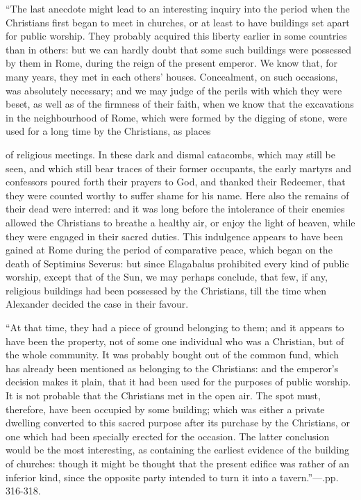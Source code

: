 ``The last
anecdote might lead to an interesting inquiry into the period when the
Christians first began to meet in churches, or at least to have
buildings set apart for public worship. They probably acquired this
liberty earlier in some countries than in others: but we can hardly
doubt that some such buildings were possessed by them in Rome, during
the reign of the present emperor. We know that, for many years, they met
in each others' houses. Concealment, on such occasions, was absolutely
necessary; and we may judge of the perils with which they were beset, as
well as of the firmness of their faith, when we know that the
excavations in the neighbourhood of Rome, which were formed by the
digging of stone, were used for a long time by the Christians, as places

of religious meetings. In these dark and dismal catacombs, which
may still be seen, and which still bear traces of their former
occupants, the early martyrs and confessors poured forth their prayers
to God, and thanked their Redeemer, that they were counted worthy to
suffer shame for his name. Here also the remains of their dead were
interred: and it was long before the intolerance of their enemies
allowed the Christians to breathe a healthy air, or enjoy the light of
heaven, while they were engaged in their sacred duties. This indulgence
appears to have been gained at Rome during the period of comparative
peace, which began on the death of Septimius Severus: but since
Elagabalus prohibited every kind of public worship, except that of the
Sun, we may perhaps conclude, that few, if any, religious buildings had
been possessed by the Christians, till the time when Alexander decided
the case in their favour.

``At that
time, they had a piece of ground belonging to them; and it appears to
have been the property, not of some one individual who was a Christian,
but of the whole community. It was probably bought out of the common
fund, which has already been mentioned as belonging to the Christians:
and the emperor's decision makes it plain, that it had been used for
the purposes of public worship. It is not probable that the Christians
met in the open air. The spot must, therefore, have been occupied by
some building; which was either a private dwelling converted to this
sacred purpose after its purchase by the Christians, or one which had
been specially erected for the occasion. The latter conclusion would be
the most interesting, as containing the earliest evidence of the
building of churches: though it might be thought that the present
edifice was rather of an inferior kind, since the opposite party
intended to turn it into a tavern.''—.pp. 316-318.

